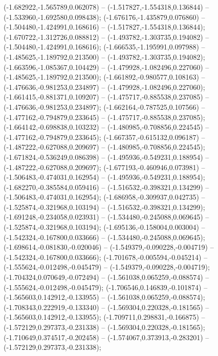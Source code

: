  (-1.682922,-1.565789,0.062078) -- (-1.517827,-1.554318,0.136844) -- (-1.533960,-1.692580,0.098438);
 (-1.676176,-1.435879,0.076860) -- (-1.504480,-1.424991,0.168616) -- (-1.517827,-1.554318,0.136844);
 (-1.670722,-1.312726,0.088812) -- (-1.493782,-1.303735,0.194082) -- (-1.504480,-1.424991,0.168616);
 (-1.666535,-1.195991,0.097988) -- (-1.485625,-1.189792,0.213500) -- (-1.493782,-1.303735,0.194082);
 (-1.663596,-1.085367,0.104429) -- (-1.479928,-1.082496,0.227060) -- (-1.485625,-1.189792,0.213500);
 (-1.661892,-0.980577,0.108163) -- (-1.476636,-0.981253,0.234897) -- (-1.479928,-1.082496,0.227060);
 (-1.661415,-0.881371,0.109207) -- (-1.475717,-0.885538,0.237085) -- (-1.476636,-0.981253,0.234897);
 (-1.662164,-0.787525,0.107566) -- (-1.477162,-0.794879,0.233645) -- (-1.475717,-0.885538,0.237085);
 (-1.664142,-0.698838,0.103232) -- (-1.480985,-0.708856,0.224545) -- (-1.477162,-0.794879,0.233645);
 (-1.667357,-0.615132,0.096187) -- (-1.487222,-0.627088,0.209697) -- (-1.480985,-0.708856,0.224545);
 (-1.671824,-0.536249,0.086398) -- (-1.495936,-0.549231,0.188954) -- (-1.487222,-0.627088,0.209697);
 (-1.677193,-0.460946,0.073981) -- (-1.506483,-0.474031,0.162954) -- (-1.495936,-0.549231,0.188954);
 (-1.682270,-0.385584,0.059416) -- (-1.516532,-0.398321,0.134299) -- (-1.506483,-0.474031,0.162954);
 (-1.686958,-0.309937,0.042735) -- (-1.525874,-0.321968,0.103194) -- (-1.516532,-0.398321,0.134299);
 (-1.691248,-0.234058,0.023931) -- (-1.534480,-0.245088,0.069645) -- (-1.525874,-0.321968,0.103194);
 (-1.695136,-0.158004,0.003004) -- (-1.542324,-0.167800,0.033666) -- (-1.534480,-0.245088,0.069645);
 (-1.698614,-0.081830,-0.020046) -- (-1.549379,-0.090228,-0.004719) -- (-1.542324,-0.167800,0.033666);
 (-1.701678,-0.005594,-0.045214) -- (-1.555624,-0.012498,-0.045479) -- (-1.549379,-0.090228,-0.004719);
 (-1.704324,0.070649,-0.072494) -- (-1.561038,0.065259,-0.088574) -- (-1.555624,-0.012498,-0.045479);
 (-1.706546,0.146839,-0.101874) -- (-1.565603,0.142912,-0.133955) -- (-1.561038,0.065259,-0.088574);
 (-1.708343,0.222919,-0.133340) -- (-1.569304,0.220328,-0.181565) -- (-1.565603,0.142912,-0.133955);
 (-1.709711,0.298831,-0.166875) -- (-1.572129,0.297373,-0.231338) -- (-1.569304,0.220328,-0.181565);
 (-1.710649,0.374517,-0.202458) -- (-1.574067,0.373913,-0.283201) -- (-1.572129,0.297373,-0.231338);
